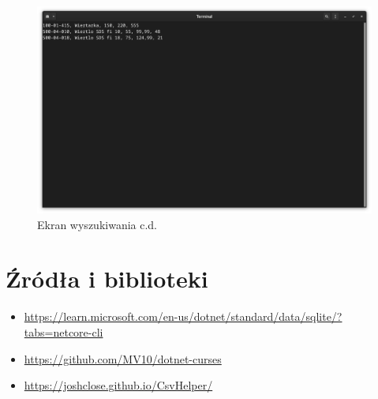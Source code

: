 \documentclass[12pt,a4paper]{article}
\begin{document}
\begin{figure}[hp]
\centering

\includegraphics[scale=.30]{figures/ekran_wyszukiwania_2.png}

\caption{Ekran wyszukiwania c.d.}
\end{figure}

\clearpage
\section{Źródła i biblioteki}
\begin{itemize}
    \item \url{https://learn.microsoft.com/en-us/dotnet/standard/data/sqlite/?tabs=netcore-cli}
    \item \url{https://github.com/MV10/dotnet-curses}
    \item \url{https://joshclose.github.io/CsvHelper/}
\end{itemize}
\end{document}
